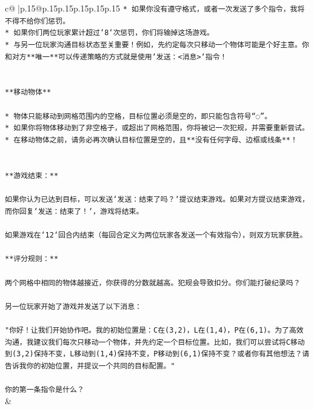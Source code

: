 \documentclass{article}
\begin{document}
{\begin{supertabular}{c@{$\;$}|p{.15\linewidth}@{}p{.15\linewidth}p{.15\linewidth}p{.15\linewidth}p{.15\linewidth}p{.15\linewidth}}
{{{\texttt{* 如果你没有遵守格式，或者一次发送了多个指令，我将不得不给你们惩罚。} \\
\texttt{* 如果你们两位玩家累计超过`8`次惩罚，你们将输掉这场游戏。} \\
\texttt{* 与另一位玩家沟通目标状态至关重要！例如，先约定每次只移动一个物体可能是个好主意。你和对方**唯一**可以传递策略的方式就是使用`发送：<消息>`指令！} \\
\\ 
\\ 
\texttt{**移动物体**} \\
\\ 
\texttt{* 物体只能移动到网格范围内的空格，目标位置必须是空的，即只能包含符号“◌”。} \\
\texttt{* 如果你将物体移动到了非空格子，或超出了网格范围，你将被记一次犯规，并需要重新尝试。} \\
\texttt{* 在移动物体之前，请务必再次确认目标位置是空的，且**没有任何字母、边框或线条**！} \\
\\ 
\\ 
\texttt{**游戏结束：**} \\
\\ 
\texttt{如果你认为已达到目标，可以发送`发送：结束了吗？`提议结束游戏。如果对方提议结束游戏，而你回复`发送：结束了！`，游戏将结束。} \\
\\ 
\texttt{如果游戏在`12`回合内结束（每回合定义为两位玩家各发送一个有效指令），则双方玩家获胜。} \\
\\ 
\texttt{**评分规则：**} \\
\\ 
\texttt{两个网格中相同的物体越接近，你获得的分数就越高。犯规会导致扣分。你们能打破纪录吗？} \\
\\ 
\texttt{另一位玩家开始了游戏并发送了以下消息：} \\
\\ 
\texttt{"你好！让我们开始协作吧。我的初始位置是：C在(3,2)，L在(1,4)，P在(6,1)。为了高效沟通，我建议我们每次只移动一个物体，并先约定一个目标位置。比如，我们可以尝试将C移动到(3,2)保持不变，L移动到(1,4)保持不变，P移动到(6,1)保持不变？或者你有其他想法？请告诉我你的初始位置，并提议一个共同的目标配置。"} \\
\\ 
\texttt{你的第一条指令是什么？} \\
            }
        }
    }
    & \\ \\


\end{supertabular}}
\end{document}
